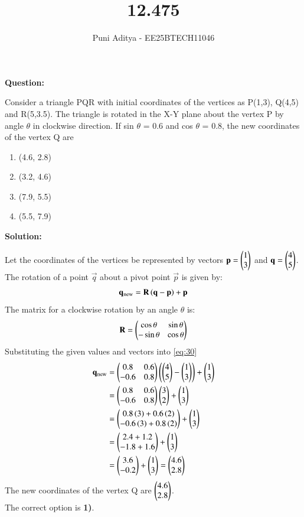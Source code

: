 \documentclass[journal]{IEEEtran}
\begin{document}
\title{12.475}
\author{Puni Aditya - EE25BTECH11046}
\maketitle

\textbf{Question:}

Consider a triangle PQR with initial coordinates of the vertices as P(1,3), Q(4,5) and R(5,3.5). The triangle is rotated in the X-Y plane about the vertex P by angle $\theta$ in clockwise direction. If sin $\theta$ = 0.6 and cos $\theta$ = 0.8, the new coordinates of the vertex Q are
\begin{enumerate}
    \item (4.6, 2.8)
    \item (3.2, 4.6)
    \item (7.9, 5.5)
    \item (5.5, 7.9)
\end{enumerate}

\textbf{Solution:}

Let the coordinates of the vertices be represented by vectors $\mathbf{p} = \begin{pmatrix}1 \\ 3\end{pmatrix}$ and $\mathbf{q} = \begin{pmatrix}4 \\ 5\end{pmatrix}$.
The rotation of a point $\vec{q}$ about a pivot point $\vec{p}$ is given by:
\begin{align}
    \mathbf{q}_{\text{new}} = \mathbf{R}\left(\mathbf{q} - \mathbf{p}\right) + \mathbf{p} \label{eq:30}
\end{align}
The matrix for a clockwise rotation by an angle $\theta$ is:
\begin{align}
    \mathbf{R} = \begin{pmatrix}\cos\theta & \sin\theta \\ -\sin\theta & \cos\theta\end{pmatrix}
\end{align}
Substituting the given values and vectors into \eqref{eq:30}
\begin{align}
    \mathbf{q}_{\text{new}} &= \begin{pmatrix}0.8 & 0.6 \\ -0.6 & 0.8\end{pmatrix}\left(\begin{pmatrix}4 \\ 5\end{pmatrix} - \begin{pmatrix}1 \\ 3\end{pmatrix}\right) + \begin{pmatrix}1 \\ 3\end{pmatrix}  \\
    &= \begin{pmatrix}0.8 & 0.6 \\ -0.6 & 0.8\end{pmatrix}\begin{pmatrix}3 \\ 2\end{pmatrix} + \begin{pmatrix}1 \\ 3\end{pmatrix}  \\
    &= \begin{pmatrix}0.8\left(3\right) + 0.6\left(2\right) \\ -0.6\left(3\right) + 0.8\left(2\right)\end{pmatrix} + \begin{pmatrix}1 \\ 3\end{pmatrix}  \\
    &= \begin{pmatrix}2.4 + 1.2 \\ -1.8 + 1.6\end{pmatrix} + \begin{pmatrix}1 \\ 3\end{pmatrix}  \\
    &= \begin{pmatrix}3.6 \\ -0.2\end{pmatrix} + \begin{pmatrix}1 \\ 3\end{pmatrix} = \begin{pmatrix}4.6 \\ 2.8\end{pmatrix}
\end{align}
The new coordinates of the vertex Q are $\begin{pmatrix}4.6 \\ 2.8\end{pmatrix}$. \\
The correct option is \textbf{1)}.
\end{document}
